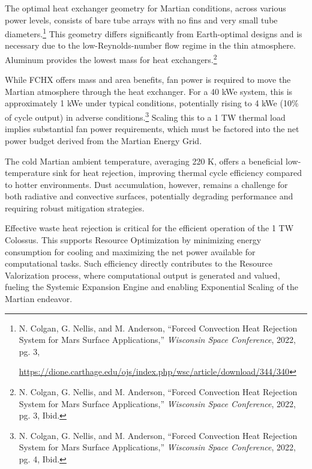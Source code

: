 \documentclass[fontsize=10pt, oneside, DIV=calc]{scrartcl}
\begin{document}
\medskip

\noindent
The optimal heat exchanger geometry for Martian conditions, across various power levels, consists of bare tube arrays with no fins and very small tube diameters.\footnote{N. Colgan, G. Nellis, and M. Anderson, ``Forced Convection Heat Rejection System for Mars Surface Applications,'' \textit{Wisconsin Space Conference}, 2022, pg. 3, 







\href{https://dione.carthage.edu/ojs/index.php/wsc/article/download/344/340}\url{https://dione.carthage.edu/ojs/index.php/wsc/article/download/344/340}} This geometry differs significantly from Earth-optimal designs and is necessary due to the low-Reynolds-number flow regime in the thin atmosphere. Aluminum provides the lowest mass for heat exchangers.\footnote{N. Colgan, G. Nellis, and M. Anderson, ``Forced Convection Heat Rejection System for Mars Surface Applications,'' \textit{Wisconsin Space Conference}, 2022, pg. 3, Ibid.}

\medskip

\noindent
While FCHX offers mass and area benefits, fan power is required to move the Martian atmosphere through the heat exchanger. For a 40 kWe system, this is approximately 1 kWe under typical conditions, potentially rising to 4 kWe (10\% of cycle output) in adverse conditions.\footnote{N. Colgan, G. Nellis, and M. Anderson, ``Forced Convection Heat Rejection System for Mars Surface Applications,'' \textit{Wisconsin Space Conference}, 2022, pg. 4, Ibid.} Scaling this to a 1 TW thermal load implies substantial fan power requirements, which must be factored into the net power budget derived from the Martian Energy Grid.

\medskip

\noindent
The cold Martian ambient temperature, averaging 220 K, offers a beneficial low-temperature sink for heat rejection, improving thermal cycle efficiency compared to hotter environments. Dust accumulation, however, remains a challenge for both radiative and convective surfaces, potentially degrading performance and requiring robust mitigation strategies.

\medskip

\noindent
Effective waste heat rejection is critical for the efficient operation of the 1 TW Colossus. This supports Resource Optimization by minimizing energy consumption for cooling and maximizing the net power available for computational tasks. Such efficiency directly contributes to the Resource Valorization process, where computational output is generated and valued, fueling the Systemic Expansion Engine and enabling Exponential Scaling of the Martian endeavor.
\end{document}
